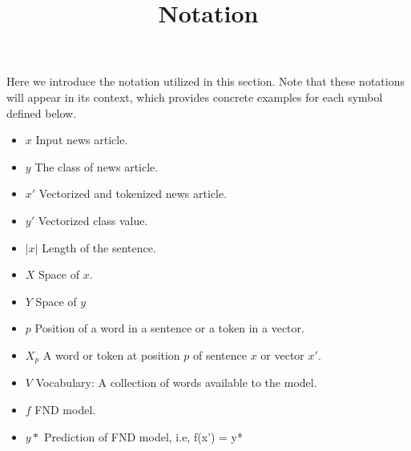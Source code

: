 
\title{Notation}
Here we introduce the notation utilized in this section. Note that these notations will appear in its context, which provides concrete examples for each symbol defined below.\\
\begin{itemize}
    \item $x$ Input news article.
    \item $y$ The class of news article.
    \item $x'$ Vectorized and tokenized news article.
    \item $y'$ Vectorized class value.
    \item $|x|$ Length of the sentence.
    \item $X$ Space of $x$.
    \item $Y$ Space of $y$
    \item $p$ Position of a word in a sentence or a token in a vector.
    \item $X_p$ A word or token at position $p$ of sentence $x$ or vector $x'$.
    \item $V$ Vocabulary: A collection of words available to the model.
    \item $f$ FND model.
    \item $y*$ Prediction of FND model, i.e, f(x') = y*
\end{itemize}